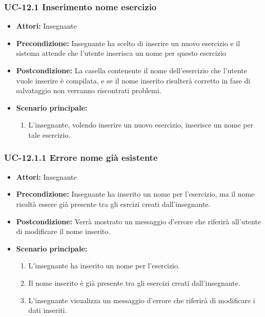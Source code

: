 \subsubsection{UC-12.1 Inserimento nome esercizio}
\begin{itemize}
\item \textbf{Attori: }Insegnante

\item \textbf{Precondizione: }Insegnante ha scelto di inserire un nuovo esercizio e il sistema attende che l'utente inserisca un nome per questo esercizio
\item \textbf{Postcondizione: }La casella contenente il nome dell'esercizio che l'utente vuole inserire è compilata, e se il nome inserito risulterà corretto in fase di salvataggio non verranno riscontrati problemi.
\item \textbf{Scenario principale: }
		\begin{enumerate}
		\item L'insegnante, volendo inserire un nuovo esercizio, inserisce un nome per tale esercizio.
		\end{enumerate}
		
\end{itemize}
\subsubsection{UC-12.1.1 Errore nome già esistente}
\begin{itemize}
\item \textbf{Attori: }Insegnante

\item \textbf{Precondizione: }Insegnante ha inserito un nome per l'esercizio, ma il nome risultà essere già presente tra gli esrcizi creati dall'insegnante.
\item \textbf{Postcondizione: }Verrà mostrato un messaggio d'errore che riferirà all'utente di modificare il nome inserito.
\item \textbf{Scenario principale: }
		\begin{enumerate}
		\item L'insegnante ha inserito un nome per l'esercizio.
		\item Il nome inserito è già presente tra gli esercizi creati dall'insegnante.
		\item L'insegnante visualizza un messaggio d'errore che riferirà di modificare i dati inseriti.
		\end{enumerate}
		
\end{itemize}
